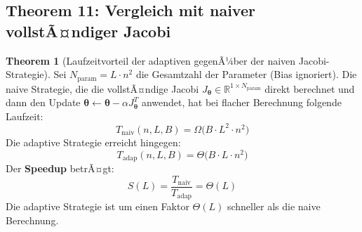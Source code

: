 ﻿\documentclass[a4paper,12pt]{article}
\theoremstyle{definition}
\newtheorem{theorem}{Theorem}
\begin{document}
\subsection{Theorem 11: Vergleich mit naiver vollstÃ¤ndiger Jacobi}

\begin{theorem}[Laufzeitvorteil der adaptiven gegenÃ¼ber der naiven Jacobi-Strategie]
	\label{thm:comparison}
	Sei $N_{\mathrm{param}} = L \cdot n^2$ die Gesamtzahl der Parameter (Bias ignoriert). Die naive Strategie, die die vollstÃ¤ndige Jacobi $J_{\boldsymbol{\theta}} \in \mathbb{R}^{1 \times N_{\mathrm{param}}}$ direkt berechnet und dann den Update $\boldsymbol{\theta} \leftarrow \boldsymbol{\theta} - \alpha J_{\boldsymbol{\theta}}^T$ anwendet, hat bei flacher Berechnung folgende Laufzeit:
	\[
	T_{\mathrm{naiv}}(n, L, B) = \Omega\bigl(B \cdot L^2 \cdot n^2\bigr)
	\]
	Die adaptive Strategie erreicht hingegen:
	\[
	T_{\mathrm{adap}}(n, L, B) = \Theta\bigl(B \cdot L \cdot n^2\bigr)
	\]
	Der \textbf{Speedup} betrÃ¤gt:
	\[
	S(L) = \frac{T_{\mathrm{naiv}}}{T_{\mathrm{adap}}} = \Theta(L)
	\]
	Die adaptive Strategie ist um einen Faktor $\Theta(L)$ schneller als die naive Berechnung.
\end{theorem}
\end{document}
